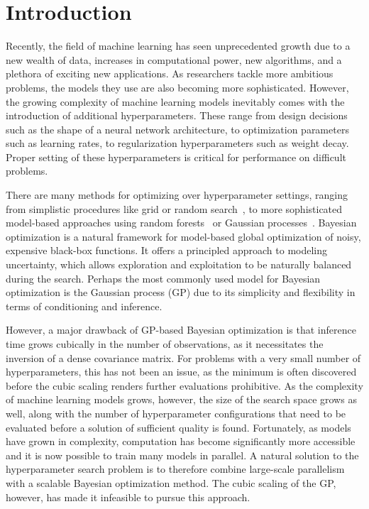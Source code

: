 \documentclass{article}
\begin{document}
\section{Introduction}
Recently, the field of machine learning has seen unprecedented growth due to a new wealth of data, increases in computational power, new algorithms, and a plethora of exciting new applications. As researchers tackle more ambitious problems, the models they use are also becoming more sophisticated. However, the growing complexity of machine learning models inevitably comes with the introduction of additional hyperparameters. These range from design decisions such as the shape of a neural network architecture, to optimization parameters such as learning rates, to regularization hyperparameters such as weight decay. Proper setting of these hyperparameters is critical for performance on difficult problems.

There are many methods for optimizing over hyperparameter settings, ranging from simplistic procedures like grid or random search~\cite{bergstra-bengio-2012a}, to more sophisticated model-based approaches using random forests~\cite{hutter-2011a} or Gaussian processes~\cite{snoek-etal-2012b}. Bayesian optimization is a natural framework for model-based global optimization of noisy, expensive black-box functions. It offers a principled approach to modeling uncertainty, which allows exploration and exploitation  to be naturally balanced during the search. Perhaps the most commonly used model for Bayesian optimization is the Gaussian process (GP) due to its simplicity and flexibility in terms of conditioning and inference.

However, a major drawback of GP-based Bayesian optimization is that inference time grows cubically in the number of observations, as it necessitates the inversion of a dense covariance matrix. For problems with a very small number of hyperparameters, this has not been an issue, as the minimum is often discovered before the cubic scaling renders further evaluations prohibitive. As the complexity of machine learning models grows, however, the size of the search space grows as well, along with the number of hyperparameter configurations that need to be evaluated before a solution of sufficient quality is found. Fortunately, as models have grown in complexity, computation has become significantly more accessible and it is now possible to train many models in parallel. A natural solution to the hyperparameter search problem is to therefore combine large-scale parallelism with a scalable Bayesian optimization method. The cubic scaling of the GP, however, has made it infeasible to pursue this approach.
\end{document}
